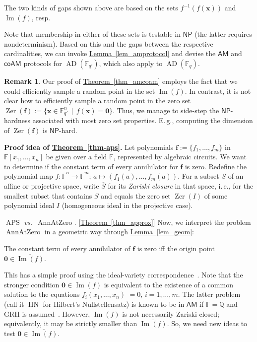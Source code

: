\documentclass[11pt]{article}
\numberwithin{equation}{section}
\theoremstyle{definition}
\newtheorem{remark}[theorem]{Remark}
\theoremstyle{plain}
\newcommand{\cclass}[1]{\textsf{#1}}
\newcommand{\ie}{i.\,e.}
\newcommand{\Eg}{E.\,g.}
\newcommand{\expref}[2]{\hyperref[#2]{#1~\ref{#2}}}
\newcommand{\F}{\mathbb{F}}
\DeclareMathOperator{\im}{\mathrm{Im}}
\DeclareMathOperator{\zer}{\mathrm{Zer}}
\newcommand{\ol}[1]{\overline{#1}}
\newcommand{\NP}{\cclass{NP}\xspace}  %
\newcommand{\AM}{\cclass{AM}\xspace}  %
\newcommand{\coAM}{\cclass{coAM}\xspace}  %
\DeclareMathOperator{\AD}{\mathrm{AD}\xspace} %
\DeclareMathOperator{\APS}{\mathrm{APS}\xspace} %
\DeclareMathOperator{\AnnAtZero}{\mathrm{AnnAtZero}\xspace} %
\DeclareMathOperator{\HN}{\mathrm{HN}\xspace} %
\begin{document}
The two kinds of gaps shown above are based on the
%
sets   %
%
$f^{-1}(f(\mathbf x))$
%
and $\im(f)$, resp.   %

Note that membership in either of these sets is testable in $\NP$ (the latter requires nondeterminism). Based on this and the gaps between the respective cardinalities, we can invoke \expref{Lemma}{lem_amprotocol} and devise the
$\AM$ and $\coAM$ protocols for
%
$\AD(\F_{q'})$,    %
which also apply to
%
$\AD(\F_q)$.    %

%
\begin{remark}   %
%
Our proof of \expref{Theorem}{thm_amcoam} employs the fact that we could efficiently sample %
a random point in the set $\im(f)$. In contrast, it is not clear how to 
efficiently %
sample a random point in the zero set $\zer(\mathbf f):= \{\mathbf x\in \F_{q'}^n \,\mid\, f(\mathbf x)= \mathbf 0\}$. Thus, we manage to side-step the $\NP$-hardness associated with most zero set properties. \Eg, computing the dimension of $\zer(\mathbf f)$ is $\NP$-hard.
\end{remark}
  
\smallskip\noindent
\textbf{Proof idea of \expref{Theorem} {thm-aps}.} 
Let polynomials 
%
$\mathbf f:= \{f_1,\dots,f_m\}$ in $\F[x_1,\dots,x_n]$ be given over a field $\F$,
represented by algebraic circuits. %
We want to determine if the constant term of every annihilator for $\mathbf f$ is zero. Redefine the polynomial map $f:\ol{\F}^n\to \ol{\F}^m$; $a\mapsto (f_1(a),\dots,f_m(a))$. For a subset $S$ of an affine
%
or projective   %
space, write $\overline{S}$ for its \emph{Zariski closure} in that space, \ie,
%
for  %
the smallest subset that contains $S$ and equals the zero set $\zer(I)$ of some polynomial %
ideal $I$ (homogeneous ideal in the projective case).  %

\emph{$\APS$ vs.\ $\AnnAtZero$.} [\expref{Theorem}{thm_approx}] Now, we interpret the problem $\AnnAtZero$ in a geometric way through \expref{Lemma}{lem_geom}:

 The constant term of every annihilator of $\mathbf f$ is zero iff the origin point $\mathbf 0\in \ol{\im(f)}$. 
 
This has a simple proof using the ideal-variety correspondence~\cite{Har92}. Note that the stronger condition $\mathbf 0\in\im(f)$ is equivalent to the existence of a common solution to the equations $f_i(x_1,\dots,x_n)$ $=0$, $i=1,\dots,m$. The latter problem (call it 
%
$\HN$ %
for Hilbert's Nullstellensatz) is known to be in $\AM$ if  $\F=\mathbb{Q}$ and GRH is assumed~\cite{koiran1996hilbert}.
However, $\im(f)$ is not necessarily Zariski closed; equivalently, it may be strictly smaller than $\ol{\im(f)}$. So, we need new ideas to test $\mathbf{0}\in \overline{\im(f)}$. 
  
\end{document}
